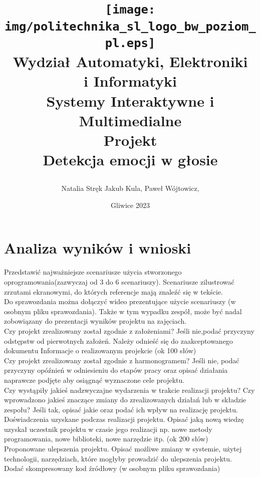 \documentclass[12pt,titlepage]{article}
\title{
\texttt{[image: img/politechnika\_sl\_logo\_bw\_poziom\_pl.eps]}\\
\textbf{Wydział Automatyki, Elektroniki\\
i Informatyki}\\
\vspace*{1cm}
Systemy Interaktywne i Multimedialne \\ Projekt \\ Detekcja emocji w głosie

\vspace*{5cm}
}
\author{
Natalia Stręk
Jakub Kula,
Paweł Wójtowicz,
}
\date{Gliwice 2023}
\begin{document}
\maketitle

\tableofcontents

\newpage
\section{Analiza wyników i wnioski}
Przedstawić najważniejsze scenariusze użycia stworzonego oprogramowania(zazwyczaj od 3 do 6 scenariuszy). Scenariusze zilustrować zrzutami ekranowymi, do których referencje mają znaleźć się w tekście.\\

Do sprawozdania można dołączyć wideo prezentujące użycie scenariuszy (w osobnym pliku sprawozdania). Także w tym wypadku zespół, może być nadal zobowiązany do prezentacji wyników projektu na zajęciach.\\

Czy projekt zrealizowany został zgodnie z założeniami? Jeśli nie,podać przyczyny odstępstw od pierwotnych założeń. Należy odnieść się do zaakceptowanego dokumentu Informacje o realizowanym projekcie (ok 100 słów)\\

Czy projekt zrealizowany został zgodnie z harmonogramem? Jeśli nie, podać przyczyny opóźnień w odniesieniu do etapów pracy oraz opisać działania naprawcze podjęte aby osiągnąć wyznaczone cele projektu.\\

Czy wystąpiły jakieś nadzwyczajne wydarzenia w trakcie realizacji projektu? Czy wprowadzono jakieś znaczące zmiany do zrealizowanych działań lub w składzie zespołu? Jeśli tak, opisać jakie oraz podać ich wpływ na realizację projektu.\\

Doświadczenia uzyskane podczas realizacji projektu. Opisać jaką nową wiedzę uzyskał uczestnik projektu w czasie jego realizacji np. nowe metody programowania, nowe biblioteki, nowe narzędzie itp. (ok 200 słów)\\

Proponowane ulepszenia projektu. Opisać możliwe zmiany w systemie, użytej technologii, narzędziach, które mogłyby prowadzić do ulepszenia projektu.\\

Dodać skompresowany kod źródłowy (w osobnym pliku sprawozdania)
\end{document}

